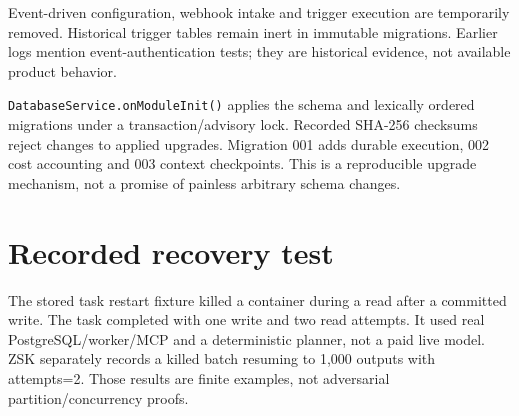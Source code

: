Event-driven configuration, webhook intake and trigger execution are temporarily removed. Historical trigger tables remain inert in immutable migrations. Earlier logs mention event-authentication tests; they are historical evidence, not available product behavior.

\texttt{DatabaseService.onModuleInit()} applies the schema and lexically ordered migrations under a transaction/advisory lock. Recorded SHA-256 checksums reject changes to applied upgrades. Migration 001 adds durable execution, 002 cost accounting and 003 context checkpoints. This is a reproducible upgrade mechanism, not a promise of painless arbitrary schema changes.
\section{Recorded recovery test}
The stored task restart fixture killed a container during a read after a committed write. The task completed with one write and two read attempts. It used real PostgreSQL/worker/MCP and a deterministic planner, not a paid live model. ZSK separately records a killed batch resuming to 1,000 outputs with attempts=2. Those results are finite examples, not adversarial partition/concurrency proofs.
